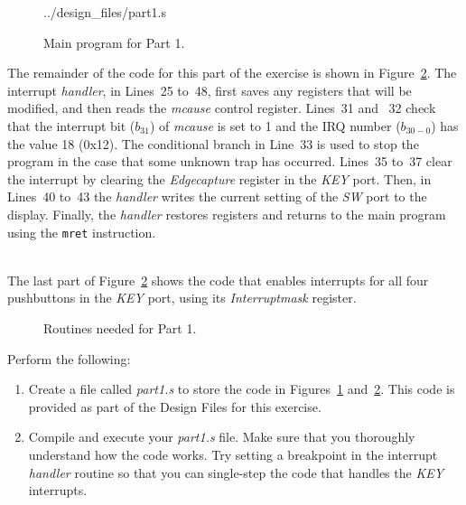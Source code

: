 \documentclass[epsfig,10pt,fullpage]{article}
\begin{document}
\begin{figure}[H]
\begin{center}
\begin{minipage}[h]{14.5 cm}

{../design_files/part1.s}
\caption{Main program for Part 1.}
\label{fig:code}
\end{minipage}
\end{center}
\end{figure}

The remainder of the code for this part of the exercise is shown in Figure~\ref{fig:routines}. 
The interrupt {\it handler}, in Lines~25 to~48, first saves any registers that will be modified, and
then reads the {\it mcause} control register. Lines~31 and ~32 check that the interrupt
bit ($b_{31}$) of {\it mcause} is set to 1 and the IRQ number ($b_{30-0}$) has the value 18 (0x12). 
The conditional branch in Line~33 is used to stop the program in the case that some
unknown trap has occurred. Lines~35 to~37 clear the interrupt by clearing the {\it Edgecapture}
register in the {\it KEY} port. Then, in Lines~40 to~43 the {\it handler} writes the
current setting of the {\it SW} port to the  display. Finally, the {\it handler}
restores registers and returns to the main program using the \texttt{mret} instruction. 

~\\
The last part of Figure~\ref{fig:routines} shows the code that enables interrupts for all
four pushbuttons in the {\it KEY} port, using its {\it Interruptmask} register.

\begin{figure}[H]
\begin{center}
\begin{minipage}[h]{14.5 cm}

\caption{Routines needed for Part 1.}
\label{fig:routines}
\end{minipage}
\end{center}
\end{figure}

Perform the following:

\begin{enumerate}
\item Create a file called {\it part1.s} to store the code in Figures~\ref{fig:code}
and~\ref{fig:routines}. This code is provided as part of the Design Files for this
exercise. 

\item 
Compile and execute your {\it part1.s} file. Make sure that you thoroughly understand how
the code works. Try setting a breakpoint in the interrupt {\it handler} routine so that
you can single-step the code that handles the {\it KEY} interrupts.
\end{enumerate}
\end{document}
